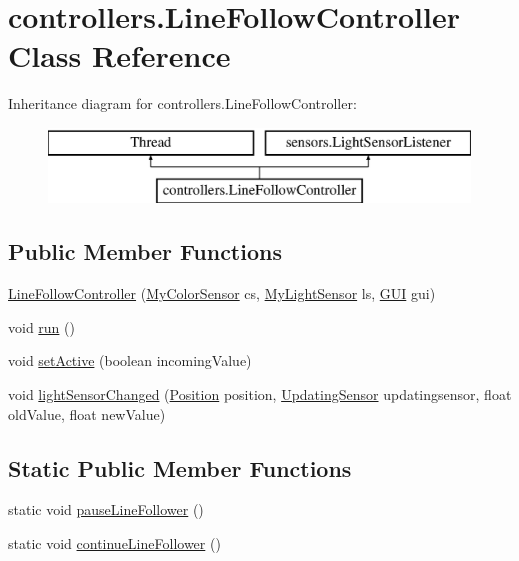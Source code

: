 \hypertarget{classcontrollers_1_1_line_follow_controller}{\section{controllers.\-Line\-Follow\-Controller Class Reference}
\label{classcontrollers_1_1_line_follow_controller}
}
Inheritance diagram for controllers.\-Line\-Follow\-Controller\-:\begin{figure}[H]
\begin{center}
\leavevmode
\includegraphics[height=2.000000cm]{classcontrollers_1_1_line_follow_controller}
\end{center}
\end{figure}
\subsection*{Public Member Functions}
\begin{DoxyCompactItemize}
\item 
\hyperlink{classcontrollers_1_1_line_follow_controller_a3d348192dadb4523ea57a9165720a01d}{Line\-Follow\-Controller} (\hyperlink{classsensors_1_1_my_color_sensor}{My\-Color\-Sensor} cs, \hyperlink{classsensors_1_1_my_light_sensor}{My\-Light\-Sensor} ls, \hyperlink{classgui_1_1_g_u_i}{G\-U\-I} gui)
\item 
void \hyperlink{classcontrollers_1_1_line_follow_controller_ab0d8c9fa9e91633438c1e4ae778017fa}{run} ()
\item 
void \hyperlink{classcontrollers_1_1_line_follow_controller_afeee12743ec4cedb303c6b6cd72489bd}{set\-Active} (boolean incoming\-Value)
\item 
void \hyperlink{classcontrollers_1_1_line_follow_controller_a673cf765cff30bc14f9bfd8eb54dc6dd}{light\-Sensor\-Changed} (\hyperlink{enumsensors_1_1_position}{Position} position, \hyperlink{interfacesensors_1_1_updating_sensor}{Updating\-Sensor} updatingsensor, float old\-Value, float new\-Value)
\end{DoxyCompactItemize}
\subsection*{Static Public Member Functions}
\begin{DoxyCompactItemize}
\item 
static void \hyperlink{classcontrollers_1_1_line_follow_controller_a304089767b35529b1aa8e0d6c9355109}{pause\-Line\-Follower} ()
\item 
static void \hyperlink{classcontrollers_1_1_line_follow_controller_aefc55f5d77bcc8a1ac339e08adc5bccb}{continue\-Line\-Follower} ()
\end{DoxyCompactItemize}


